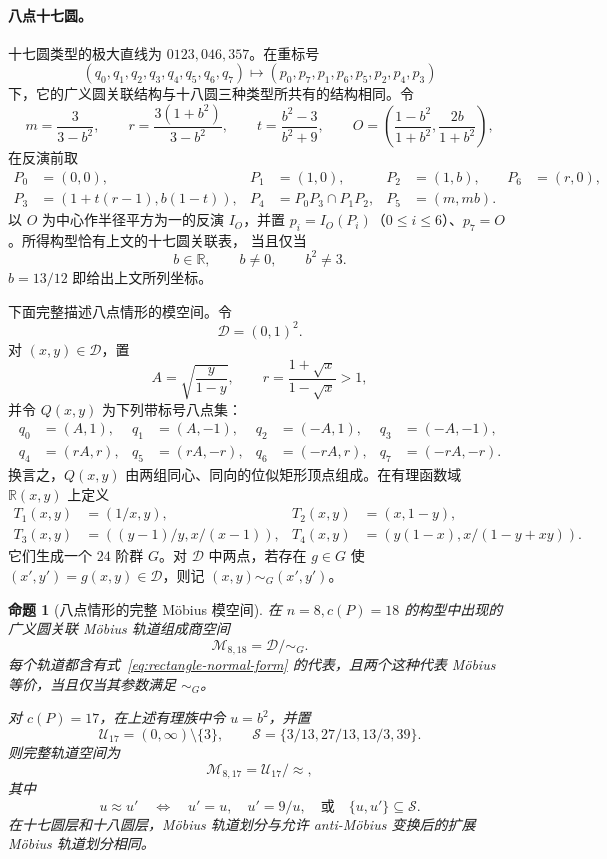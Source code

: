 \documentclass[11pt,a4paper]{ctexart}
\newtheorem{proposition}[theorem]{命题}
\theoremstyle{definition}
\begin{document}
\paragraph{八点十七圆。}
十七圆类型的极大直线为 $0123,046,357$。在重标号
\[
(q_0,q_1,q_2,q_3,q_4,q_5,q_6,q_7)
\longmapsto(p_0,p_7,p_1,p_6,p_5,p_2,p_4,p_3)
\]
下，它的广义圆关联结构与十八圆三种类型所共有的结构相同。令
\[
m=\frac3{3-b^2},\qquad r=\frac{3(1+b^2)}{3-b^2},\qquad
t=\frac{b^2-3}{b^2+9},\qquad
O=\left(\frac{1-b^2}{1+b^2},\frac{2b}{1+b^2}\right),
\]
在反演前取
\[
\begin{aligned}
P_0&=(0,0),&P_1&=(1,0),&P_2&=(1,b),&P_6&=(r,0),\\
P_3&=(1+t(r-1),b(1-t)),&
P_4&=P_0P_3\cap P_1P_2,&P_5&=(m,mb).
\end{aligned}
\]
以 $O$ 为中心作半径平方为一的反演 $I_O$，并置
$p_i=I_O(P_i)$（$0\le i\le6$）、$p_7=O$。所得构型恰有上文的十七圆关联表，
当且仅当
\[
b\in\mathbb R,\qquad b\ne0,\qquad b^2\ne3.
\]
$b=13/12$ 即给出上文所列坐标。

下面完整描述八点情形的模空间。令
\[
\mathcal D=(0,1)^2.
\]
对 $(x,y)\in\mathcal D$，置
\[
A=\sqrt{\frac{y}{1-y}},\qquad
r=\frac{1+\sqrt{x}}{1-\sqrt{x}}>1,
\]
并令 $Q(x,y)$ 为下列带标号八点集：
\begin{equation}\label{eq:rectangle-normal-form}
\begin{aligned}
q_0&=(A,1),&q_1&=(A,-1),&q_2&=(-A,1),&q_3&=(-A,-1),\\
q_4&=(rA,r),&q_5&=(rA,-r),&q_6&=(-rA,r),&q_7&=(-rA,-r).
\end{aligned}
\end{equation}
换言之，$Q(x,y)$ 由两组同心、同向的位似矩形顶点组成。在有理函数域
$\mathbb R(x,y)$ 上定义
\begin{equation}\label{eq:n8-moduli-generators}
\begin{aligned}
T_1(x,y)&=(1/x,y),&
T_2(x,y)&=(x,1-y),\\
T_3(x,y)&=((y-1)/y,x/(x-1)),&
T_4(x,y)&=(y(1-x),x/(1-y+xy)).
\end{aligned}
\end{equation}
它们生成一个 $24$ 阶群 $G$。对 $\mathcal D$ 中两点，若存在 $g\in G$ 使
$(x',y')=g(x,y)\in\mathcal D$，则记 $(x,y)\sim_G(x',y')$。

\begin{proposition}[八点情形的完整 Möbius 模空间]
\label{prop:n8-complete-moduli}
在 $n=8,c(P)=18$ 的构型中出现的广义圆关联 Möbius 轨道组成商空间
\[
\mathcal M_{8,18}=\mathcal D/{\sim_G}.
\]
每个轨道都含有式~\eqref{eq:rectangle-normal-form} 的代表，且两个这种代表
Möbius 等价，当且仅当其参数满足 $\sim_G$。

对 $c(P)=17$，在上述有理族中令 $u=b^2$，并置
\[
\mathcal U_{17}=(0,\infty)\setminus\{3\},\qquad
\mathcal S=\{3/13,27/13,13/3,39\}.
\]
则完整轨道空间为
\[
\mathcal M_{8,17}=\mathcal U_{17}/{\approx},
\]
其中
\begin{equation}\label{eq:c17-equivalence}
u\approx u'
\quad\Longleftrightarrow\quad
u'=u,\quad u'=9/u,
\quad\text{或}\quad \{u,u'\}\subseteq\mathcal S.
\end{equation}
在十七圆层和十八圆层，Möbius 轨道划分与允许 anti-Möbius 变换后的扩展
Möbius 轨道划分相同。
\end{proposition}
\end{document}

